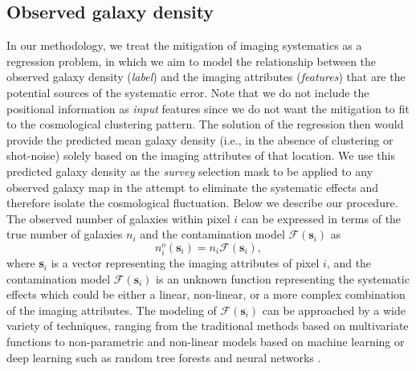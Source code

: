 \documentclass[fleqn, usenatbib]{mnras}
\begin{document}
\subsection{Observed galaxy density}
In our methodology, we treat the mitigation of imaging systematics as a regression problem, in which we aim to model the relationship between the observed galaxy density (\textit{label}) and the imaging attributes (\textit{features}) that are the potential sources of the systematic error. Note that we do not include the positional information as \textit{input} features since we do not want the mitigation to fit to the cosmological clustering pattern. The solution of the regression then would provide the predicted mean galaxy density (i.e., in the absence of clustering or shot-noise) solely based on the imaging attributes of that location. We use this predicted galaxy density as the \textit{survey} selection mask to be applied to any observed galaxy map in the attempt to eliminate the systematic effects and therefore isolate the cosmological fluctuation. Below we describe our procedure.\\


The observed number of galaxies within pixel $i$ can be expressed in terms of the true number of galaxies $n_{i}$ and the contamination model $\mathcal{F}(\textbf{s}_{i})$ as 
\begin{equation}\label{eq:ngal_fs}
    n_{i}^{o}(\textbf{s}_{i}) = n_{i} \mathcal{F}(\textbf{s}_{i}), 
\end{equation}
where \textbf{s}$_{i}$ is a vector representing the imaging attributes of pixel $i$, and the contamination model $\mathcal{F}(\textbf{s}_i)$ is an unknown function representing the systematic effects which could be either a linear, non-linear, or a more complex combination of the imaging attributes. The modeling of $\mathcal{F}(\textbf{s}_{i})$ can be approached by a wide variety of techniques, ranging from the traditional methods based on multivariate functions to non-parametric and non-linear models based on machine learning or deep learning such as random tree forests and neural networks \citep{breiman2001random, geurts2006extremely}.\\
\end{document}
